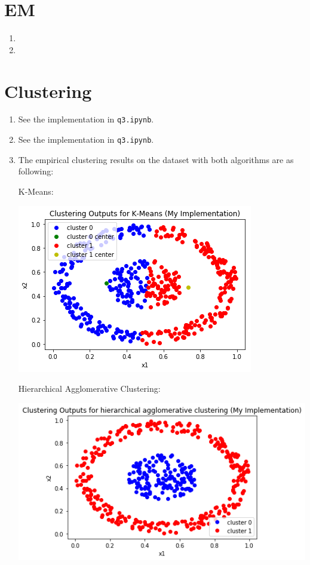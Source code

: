 \documentclass[paper=letter, fontsize=12pt]{article}
\begin{document}
\section{EM}
\begin{enumerate}[label=(\alph*)]
	\item 
	
	\item 
\end{enumerate}

\section{Clustering}
\begin{enumerate}[label=(\alph*)]
	\item See the implementation in \verb|q3.ipynb|.
	
	\item See the implementation in \verb|q3.ipynb|.
	
	\item The empirical clustering results on the dataset with both algorithms are as following:
	
	K-Means:
	
	\includegraphics[scale=0.6]{q3c1.png}
	
	Hierarchical Agglomerative Clustering:
	
	\includegraphics[scale=0.6]{q3c2.png}
	

\end{enumerate}
\end{document}
